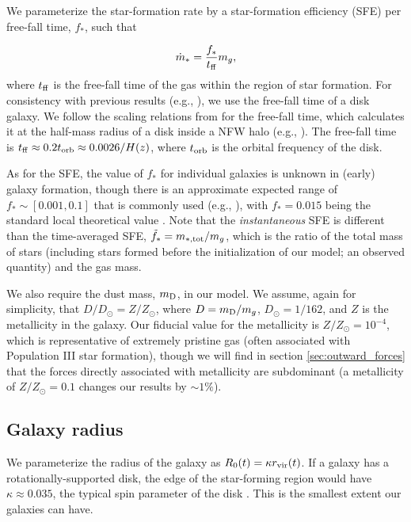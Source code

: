 \documentclass[a4paper,11pt]{article}
\begin{document}
We parameterize the star-formation rate by a star-formation efficiency (SFE) per free-fall time, $f_{*}$, such that

\begin{equation}
    \dot{m}_{*} = \frac{f_{*}}{t_{\rm ff}} m_{g}, \label{eq:mstar_dot}
\end{equation}
%
where $t_{\rm ff}$ is the free-fall time of the gas within the region of star formation. For consistency with previous results (e.g., \cite{Faucher-Giguere2018, Furlanetto2022}), we use the free-fall time of a disk galaxy. We follow the scaling relations from \cite{Faucher-Giguere2018} for the free-fall time, which calculates it at the half-mass radius of a disk inside a NFW halo (e.g., \cite{NFW1996}). The free-fall time is $t_{\rm ff} \approx 0.2 t_{\rm orb} \approx 0.0026 / H(z)$, where $t_{\rm orb}$ is the orbital frequency of the disk. 

As for the SFE, the value of $f_{*}$ for individual galaxies is unknown in (early) galaxy formation, though there is an approximate expected range of $f_{*} \sim [0.001,0.1]$ that is commonly used (e.g., \cite{Furlanetto2022}), with $f_{*} = 0.015$ being the standard local theoretical value \cite{Salim2015, Krumholz2018}. Note that the \textit{instantaneous} SFE is different than the time-averaged SFE, $\tilde{f}_{*} = m_{*, \rm tot} / m_{g}$, which is the ratio of the total mass of stars (including stars formed before the initialization of our model; an observed quantity) and the gas mass.

We also require the dust mass, $m_{\rm D}$, in our model. We assume, again for simplicity, that $D/D_{\odot} = Z/Z_{\odot}$, where $D = m_{\rm D} / m_{g}$, $D_{\odot} = 1/162$, and $Z$ is the metallicity in the galaxy. Our fiducial value for the metallicity is $Z/Z_{\odot} = 10^{-4}$, which is representative of extremely pristine gas (often associated with Population III star formation), though we will find in section \ref{sec:outward_forces} that the forces directly associated with metallicity are subdominant (a metallicity of $Z/Z_{\odot} = 0.1$ changes our results by $\sim 1 \%$).

\subsection{Galaxy radius} \label{sec:radius}

We parameterize the radius of the galaxy as $R_{0} (t) = \kappa r_{\rm vir} (t)$. If a galaxy has a rotationally-supported disk, the edge of the star-forming region would have $\kappa \approx 0.035$, the typical spin parameter of the disk \cite{GalaxyFormation&Evolution2010}. This is the smallest extent our galaxies can have.
\end{document}

